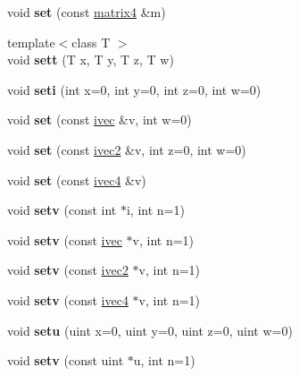 \begin{DoxyCompactItemize}
void {\bfseries set} (const \hyperlink{structmatrix4}{matrix4} \&m)
\item 
\mbox{\label{struct_local_shader_param_a85f5ae6356b0d4a01deaf701bf1394c0}} 
{\footnotesize template$<$class T $>$ }\\void {\bfseries sett} (T x, T y, T z, T w)
\item 
\mbox{\label{struct_local_shader_param_a616563343ddf0f898c724c36dcda3611}} 
void {\bfseries seti} (int x=0, int y=0, int z=0, int w=0)
\item 
\mbox{\label{struct_local_shader_param_a74a7e0b089e409978c4c291deacfcd50}} 
void {\bfseries set} (const \hyperlink{structivec}{ivec} \&v, int w=0)
\item 
\mbox{\label{struct_local_shader_param_a12630877c4a25313eb4c1698e1b1e244}} 
void {\bfseries set} (const \hyperlink{structivec2}{ivec2} \&v, int z=0, int w=0)
\item 
\mbox{\label{struct_local_shader_param_a7b00d9b9625e286a0fd0e9ee12678f05}} 
void {\bfseries set} (const \hyperlink{structivec4}{ivec4} \&v)
\item 
\mbox{\label{struct_local_shader_param_ab9df01f5336ce035a6f7dfe3caeaf6c4}} 
void {\bfseries setv} (const int $\ast$i, int n=1)
\item 
\mbox{\label{struct_local_shader_param_ae78c5acdc582aac717e759fef527e67c}} 
void {\bfseries setv} (const \hyperlink{structivec}{ivec} $\ast$v, int n=1)
\item 
\mbox{\label{struct_local_shader_param_a98b12ba0b931a9496edf2a6d512b7ebb}} 
void {\bfseries setv} (const \hyperlink{structivec2}{ivec2} $\ast$v, int n=1)
\item 
\mbox{\label{struct_local_shader_param_a4d7f5d345634fdc30dfeaec75eab868a}} 
void {\bfseries setv} (const \hyperlink{structivec4}{ivec4} $\ast$v, int n=1)
\item 
\mbox{\label{struct_local_shader_param_a2069839eb4f1c2173bb8a87bf25009c5}} 
void {\bfseries setu} (uint x=0, uint y=0, uint z=0, uint w=0)
\item 
\mbox{\label{struct_local_shader_param_accc8dbc8d2de883d89c01ca6558aef96}} 
void {\bfseries setv} (const uint $\ast$u, int n=1)
\end{DoxyCompactItemize}
